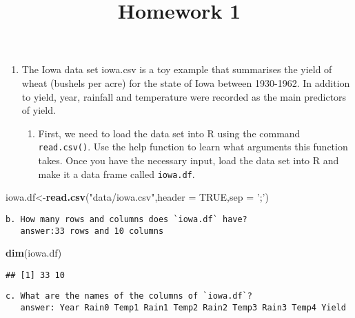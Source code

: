 \documentclass[
]{article}
\title{Homework 1}
\author{}
\date{\vspace{-2.5em}}
\newenvironment{Shaded}{\begin{snugshade}}{\end{snugshade}}
\newcommand{\DataTypeTok}[1]{\textcolor[rgb]{0.13,0.29,0.53}{#1}}
\newcommand{\KeywordTok}[1]{\textcolor[rgb]{0.13,0.29,0.53}{\textbf{#1}}}
\newcommand{\NormalTok}[1]{#1}
\newcommand{\OtherTok}[1]{\textcolor[rgb]{0.56,0.35,0.01}{#1}}
\newcommand{\StringTok}[1]{\textcolor[rgb]{0.31,0.60,0.02}{#1}}
\providecommand{\tightlist}{%
  \setlength{\itemsep}{0pt}\setlength{\parskip}{0pt}}
\begin{document}
\maketitle

\begin{enumerate}
\def\labelenumi{\arabic{enumi}.}
\tightlist
\item
  The Iowa data set iowa.csv is a toy example that summarises the yield
  of wheat (bushels per acre) for the state of Iowa between 1930-1962.
  In addition to yield, year, rainfall and temperature were recorded as
  the main predictors of yield.

  \begin{enumerate}
  \def\labelenumii{\alph{enumii}.}
  \tightlist
  \item
    First, we need to load the data set into R using the command
    \texttt{read.csv()}. Use the help function to learn what arguments
    this function takes. Once you have the necessary input, load the
    data set into R and make it a data frame called \texttt{iowa.df}.
  \end{enumerate}
\end{enumerate}

\begin{Shaded}
\begin{Highlighting}[]
\NormalTok{iowa.df<-}\KeywordTok{read.csv}\NormalTok{(}\StringTok{"data/iowa.csv"}\NormalTok{,}\DataTypeTok{header =} \OtherTok{TRUE}\NormalTok{,}\DataTypeTok{sep =} \StringTok{';'}\NormalTok{)}
\end{Highlighting}
\end{Shaded}

\begin{verbatim}
b. How many rows and columns does `iowa.df` have? 
   answer:33 rows and 10 columns
\end{verbatim}

\begin{Shaded}
\begin{Highlighting}[]
\KeywordTok{dim}\NormalTok{(iowa.df)}
\end{Highlighting}
\end{Shaded}

\begin{verbatim}
## [1] 33 10
\end{verbatim}

\begin{verbatim}
c. What are the names of the columns of `iowa.df`? 
   answer: Year Rain0 Temp1 Rain1 Temp2 Rain2 Temp3 Rain3 Temp4 Yield
\end{verbatim}
\end{document}
